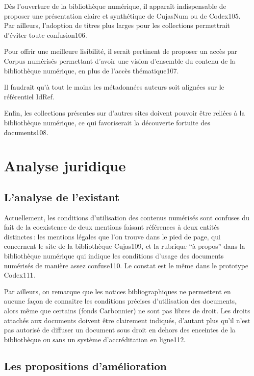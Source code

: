Dès l’ouverture de la bibliothèque numérique, il apparaît indispensable de proposer une présentation claire et synthétique de CujasNum ou de Codex105. Par ailleurs, l’adoption de titres plus larges pour les collections permettrait d’éviter toute confusion106.  

Pour offrir une meilleure lisibilité, il serait pertinent de proposer un accès par Corpus numérisés permettant d’avoir une vision d’ensemble du contenu de la bibliothèque numérique, en plus de l’accès thématique107. 

Il faudrait qu’à tout le moins les métadonnées auteurs soit alignées sur le référentiel IdRef.  

Enfin, les collections présentes sur d’autres sites doivent pouvoir être reliées à la bibliothèque numérique, ce qui favoriserait la découverte fortuite des documents108. 



\section{Analyse juridique} 

\subsection{L’analyse de l’existant}

Actuellement, les conditions d’utilisation des contenus numérisés sont confuses du fait de la coexistence de deux mentions faisant références à deux entités distinctes : les mentions légales que l’on trouve dans le pied de page, qui concernent le site de la bibliothèque Cujas109, et la rubrique \enquote{à propos} dans la bibliothèque numérique qui indique les conditions d’usage des documents numérisés de manière assez confuse110. Le constat est le même dans le prototype Codex111. 

Par ailleurs, on remarque que les notices bibliographiques ne permettent en aucune façon de connaitre les conditions précises d’utilisation des documents, alors même que certains (fonds Carbonnier) ne sont pas libres de droit. Les droits attachés aux documents doivent être clairement indiqués, d’autant plus qu’il n’est pas autorisé de diffuser un document sous droit en dehors des enceintes de la bibliothèque ou sans un système d’accréditation en ligne112.  

\subsection{Les propositions d’amélioration}

